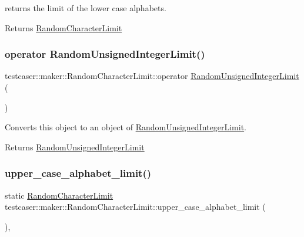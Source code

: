 returns the limit of the lower case alphabets. 

\begin{DoxyReturn}{Returns}
\mbox{\hyperlink{structtestcaser_1_1maker_1_1RandomCharacterLimit}{Random\+Character\+Limit}} 
\end{DoxyReturn}
\mbox{\label{structtestcaser_1_1maker_1_1RandomCharacterLimit_a230a33b5d028fdef4a027f7c96663d32}} 
\subsubsection{\texorpdfstring{operator RandomUnsignedIntegerLimit()}{operator RandomUnsignedIntegerLimit()}}
{\footnotesize\ttfamily testcaser\+::maker\+::\+Random\+Character\+Limit\+::operator \mbox{\hyperlink{structtestcaser_1_1maker_1_1RandomUnsignedIntegerLimit}{Random\+Unsigned\+Integer\+Limit}} (\begin{DoxyParamCaption}{ }\end{DoxyParamCaption})\hspace{0.3cm}{\ttfamily [inline]}}



Converts this object to an object of \mbox{\hyperlink{structtestcaser_1_1maker_1_1RandomUnsignedIntegerLimit}{Random\+Unsigned\+Integer\+Limit}}. 

\begin{DoxyReturn}{Returns}
\mbox{\hyperlink{structtestcaser_1_1maker_1_1RandomUnsignedIntegerLimit}{Random\+Unsigned\+Integer\+Limit}} 
\end{DoxyReturn}
\mbox{\label{structtestcaser_1_1maker_1_1RandomCharacterLimit_a7a0ee0690e97a27402faca09c6044aed}} 
\subsubsection{\texorpdfstring{upper\_case\_alphabet\_limit()}{upper\_case\_alphabet\_limit()}}
{\footnotesize\ttfamily static \mbox{\hyperlink{structtestcaser_1_1maker_1_1RandomCharacterLimit}{Random\+Character\+Limit}} testcaser\+::maker\+::\+Random\+Character\+Limit\+::upper\+\_\+case\+\_\+alphabet\+\_\+limit (\begin{DoxyParamCaption}{ }\end{DoxyParamCaption})\hspace{0.3cm}{\ttfamily [inline]}, {\ttfamily [static]}}



